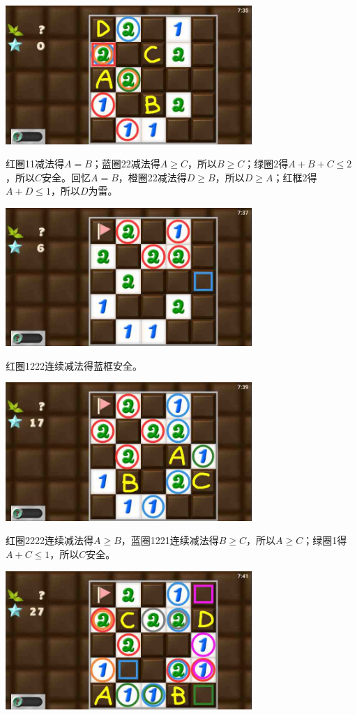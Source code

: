 \subsection{} %
\begin{center}
    \includegraphics[width=0.7\textwidth]{puzzlelow/217-1.jpg}
\end{center}
红圈11减法得$A=B$；蓝圈22减法得$A\ge C$，所以$B\ge C$；绿圈2得$A+B+C\le 2$，所以$C$安全。回忆$A=B$，橙圈22减法得$D\ge B$，所以$D\ge A$；红框2得$A+D\le 1$，所以$D$为雷。
\begin{center}
    \includegraphics[width=0.7\textwidth]{puzzlelow/217-2.jpg}
\end{center}
红圈1222连续减法得蓝框安全。
\begin{center}
    \includegraphics[width=0.7\textwidth]{puzzlelow/217-3.jpg}
\end{center}
红圈2222连续减法得$A\ge B$，蓝圈1221连续减法得$B\ge C$，所以$A\ge C$；绿圈1得$A+C\le 1$，所以$C$安全。
\begin{center}
    \includegraphics[width=0.7\textwidth]{puzzlelow/217-4.jpg}
\end{center}
